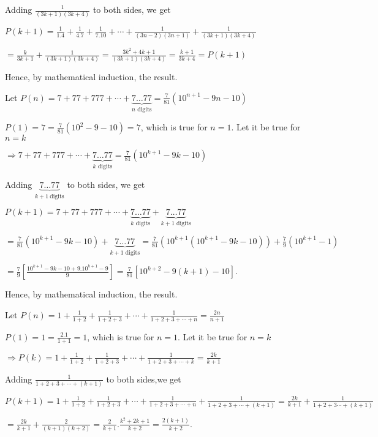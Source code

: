   Adding $\frac{1}{(3k + 1)(3k + 4)}$ to both sides, we get

  $P(k + 1) = \frac{1}{1.4} + \frac{1}{4.7} + \frac{1}{7.10} + \cdots + \frac{1}{(3n - 2)(3n + 1)} +
  \frac{1}{(3k + 1)(3k + 4)}$

  $= \frac{k}{3k + 1} + \frac{1}{(3k + 1)(3k + 4)} = \frac{3k^2 + 4k + 1}{(3k + 1)(3k + 4)} =\frac{k + 1}{3k
    + 4} = P(k + 1)$

  Hence, by mathematical induction, the result.
\item Let $P(n) = 7 + 77 + 777 + \cdots + \underbrace{7\ldots77}_{n\text{~digits}} = \frac{7}{81}(10^{n + 1} - 9n -
  10)$

  $P(1) = 7 = \frac{7}{81}(10^2 - 9 - 10) = 7$, which is true for $n = 1$. Let it be true for $n = k$

  $\Rightarrow 7 + 77 + 777 + \cdots + \underbrace{7\ldots77}_{k\text{~digits}} = \frac{7}{81}(10^{k + 1} - 9k -
  10)$

  Adding $\underbrace{7\ldots77}_{k + 1~\text{digits}}$ to both sides, we get

  $P(k + 1) = 7 + 77 + 777 + \cdots + \underbrace{7\ldots77}_{k\text{~digits}} + \underbrace{7\ldots77}_{k +
    1\text{~digits}}$

  $= \frac{7}{81}(10^{k + 1} - 9k - 10) + \underbrace{7\ldots77}_{k + 1\text{~digits}} = \frac{7}{81}(10^{k
    + 1}(10^{k + 1} - 9k - 10)) + \frac{7}{9}(10^{k + 1} - 1)$

  $= \frac{7}{9}\left[\frac{10^{k + 1} - 9k - 10 + 9.10^{k + 1} - 9}{9}\right] = \frac{7}{81}[10^{k + 2} -
    9(k + 1) - 10]$.

  Hence, by mathematical induction, the result.
\item Let $P(n) = 1 + \frac{1}{1 + 2} + \frac{1}{1 + 2 + 3} + \cdots + \frac{1}{1 + 2 + 3 + \cdots + n} =
  \frac{2n}{n + 1}$

  $P(1) = 1 = \frac{2.1}{1 + 1} = 1$, which is true for $n = 1$. Let it be true for $n = k$

  $\Rightarrow P(k) = 1 + \frac{1}{1 + 2} + \frac{1}{1 + 2 + 3} + \cdots + \frac{1}{1 + 2 + 3 + \cdots + k}
  = \frac{2k}{k + 1}$

  Adding $\frac{1}{1 + 2 + 3 + \cdots + (k + 1)}$ to both sides,we get

  $P(k + 1) = 1 + \frac{1}{1 + 2} + \frac{1}{1 + 2 + 3} + \cdots + \frac{1}{1 + 2 + 3 + \cdots + n} +
  \frac{1}{1 + 2 + 3 + \cdots + (k  + 1)} = \frac{2k}{k + 1} + \frac{1}{1 + 2 + 3 \cdots + (k + 1)}$

  $= \frac{2k}{k + 1} + \frac{2}{(k + 1)(k + 2)} = \frac{2}{k + 1}.\frac{k^2 + 2k + 1}{k + 2} = \frac{2(k +
    1)}{k + 2}$.

